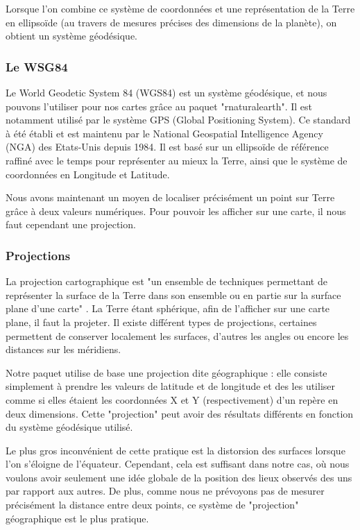 \documentclass{article}
\begin{document}
Lorsque l'on combine ce système de coordonnées et une représentation de la Terre en ellipsoïde (au travers de mesures précises des dimensions de la planète), on obtient un système géodésique.

\subsubsection{Le WSG84}

Le World Geodetic System 84 (WGS84) \cite{wgs84} est un système géodésique, et nous pouvons l'utiliser pour nos cartes grâce au paquet "rnaturalearth". Il est notamment utilisé par le système GPS (Global Positioning System). Ce standard à été établi et est maintenu par le National Geospatial Intelligence Agency (NGA) des Etats-Unis \cite{enwiki:1065796786} depuis 1984. Il est basé sur un ellipsoïde de référence raffiné avec le temps pour représenter au mieux la Terre, ainsi que le système de coordonnées en Longitude et Latitude.

Nous avons maintenant un moyen de localiser précisément un point sur Terre grâce à deux valeurs numériques. Pour pouvoir les afficher sur une carte, il nous faut cependant une projection.

\subsubsection{Projections}

La projection cartographique est "un ensemble de techniques permettant de représenter la surface de la Terre dans son ensemble ou en partie sur la surface plane d'une carte" \cite{frwiki:181713838}. La Terre étant sphérique, afin de l'afficher sur une carte plane, il faut la projeter. Il existe différent types de projections, certaines permettent de conserver localement les surfaces, d'autres les angles ou encore les distances sur les méridiens. 

Notre paquet utilise de base une projection dite géographique : elle consiste simplement à prendre les valeurs de latitude et de longitude et des les utiliser comme si elles étaient les coordonnées X et Y (respectivement) d'un repère en deux dimensions. Cette "projection" peut avoir des résultats différents en fonction du système géodésique utilisé. 

Le plus gros inconvénient de cette pratique est la distorsion des surfaces lorsque l'on s'éloigne de l'équateur. Cependant, cela est suffisant dans notre cas, où nous voulons avoir seulement une idée globale de la position des lieux observés des uns par rapport aux autres. De plus, comme nous ne prévoyons pas de mesurer précisément la distance entre deux points, ce système de "projection" géographique est le plus pratique.
\end{document}
